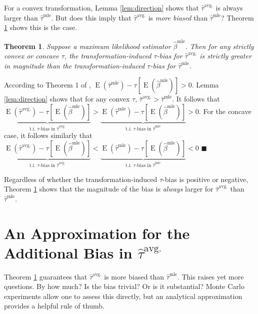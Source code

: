\documentclass[10pt]{article}
\newtheorem{theorem}{Theorem}
\newenvironment{proof}[1][Proof]{\begin{trivlist}
\item[\hskip \labelsep {\bfseries #1}]}{\end{trivlist}}
\DeclareMathOperator*{\E}{\text{E}}
\begin{document}
For a convex transformation, Lemma \ref{lem:direction} shows that $\hat{\tau}^\text{avg.}$ is always larger than $\hat{\tau}^\text{mle}$.
But does this imply that $\hat{\tau}^\text{avg.}$ is \textit{more biased} than $\hat{\tau}^\text{mle}$? Theorem \ref{thm:direction} shows this is the case.

\begin{theorem}\label{thm:direction}
Suppose a maximum likelihood estimator $\hat{\beta}^\text{mle}$. Then for any strictly convex or concave $\tau$, the transformation-induced $\tau$-bias for $\hat{\tau}^{\text{avg.}}$ is strictly greater in magnitude than the transformation-induced $\tau$-bias for $\hat{\tau}^{\text{mle}}$.
\end{theorem} 
\begin{proof}
According to Theorem 1 of \citet[p. 405]{Rainey2017}, $\E \left( \hat{\tau}^\text{mle}\right) -  \tau \left[\E \left( \hat{\beta}^\text{mle} \right) \right] > 0$.
Lemma \ref{lem:direction} shows that for any convex $\tau$, $\hat{\tau}^{\text{avg.}} > \hat{\tau}^\text{mle}$. It follows that $\underbrace{\E \left( \hat{\tau}^\text{avg.}\right) - \tau \left[\E \left( \hat{\beta}^\text{mle} \right) \right]}_{\text{t.i. } \tau\text{-bias in }\hat{\tau}^{\text{avg.}}} > \underbrace{\E \left( \hat{\tau}^\text{mle}\right) -  \tau \left[\E \left( \hat{\beta}^\text{mle} \right) \right]}_{\text{t.i. } \tau\text{-bias in }\hat{\tau}^{\text{mle}}} > 0$. For the concave case, it follows similarly that $\underbrace{\E \left( \hat{\tau}^\text{avg.}\right) - \tau \left[\E \left( \hat{\beta}^\text{mle} \right) \right]}_{\text{t.i. } \tau\text{-bias in }\hat{\tau}^{\text{avg.}}} < \underbrace{\E \left( \hat{\tau}^\text{mle}\right) -  \tau \left[\E \left( \hat{\beta}^\text{mle} \right) \right]}_{\text{t.i. } \tau\text{-bias in }\hat{\tau}^{\text{mle}}} < 0$
 $\blacksquare$
\end{proof}
Regardless of whether the transformation-induced $\tau$-bias is positive or negative, Theorem \ref{thm:direction} shows that the magnitude of the bias is \textit{always} larger for $\hat{\tau}^{\text{avg.}}$ than $\hat{\tau}^{\text{mle}}$.

\section*{An Approximation for the Additional Bias in $\hat{\tau}^\text{avg.}$}

Theorem \ref{thm:direction} guarantees that $\hat{\tau}^\text{avg.}$ is more biased than $\hat{\tau}^\text{mle}$. This raises yet more questions. By how much? Is the bias trivial? Or is it substantial? Monte Carlo experiments allow one to assess this directly, but an analytical approximation provides a helpful rule of thumb.
\end{document}
